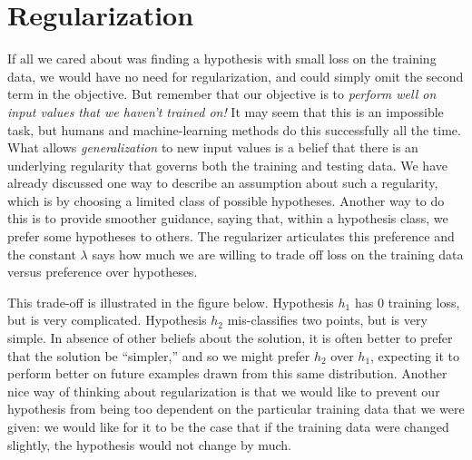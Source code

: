 \section{Regularization}

If all we cared about was finding a hypothesis with small loss on the
training data, we would have no need for regularization, and could
simply omit the second term in the objective.  But remember that our
objective is to {\em perform well on input values that we haven't
  trained on!}  It may seem that this is an impossible task, but
humans and machine-learning methods do this successfully all the
time.  What allows {\em generalization} to new input values is a
belief that there is an underlying regularity that governs both the
training and testing data.  We have already discussed one way to
describe an assumption about such a regularity, which is by choosing a
limited class of possible hypotheses.  Another way to do this is to
provide smoother guidance, saying that, within a hypothesis class, we
prefer some hypotheses to others.  The regularizer articulates this
preference and the constant $\lambda$ says how much we are willing to
trade off loss on the training data versus preference over hypotheses.

This trade-off is illustrated in the figure below.  Hypothesis $h_1$
has 0 training loss, but is very complicated.  Hypothesis $h_2$
mis-classifies two points, but is very simple.  In absence of other
beliefs about the solution, it is often better to prefer that the
solution be ``simpler,'' and so we might prefer $h_2$ over $h_1$,
expecting it to perform better on future examples drawn from this same
distribution.    Another nice way of
thinking about regularization is that we would like to prevent our
hypothesis from being too dependent on the particular training data
that we were given: we would like for it to be the case that if the
training data were changed slightly, the hypothesis would not change
by much.

\begin{center}
\end{center}


